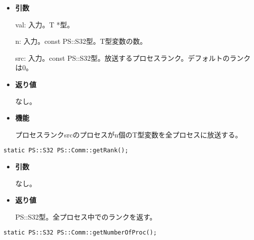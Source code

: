 \begin{itemize}

\item{{\bf 引数}}

val: 入力。T *型。

n: 入力。const PS::S32型。T型変数の数。

src: 入力。const PS::S32型。放送するプロセスランク。デフォルトのランク
は0。

\item{{\bf 返り値}}

なし。

\item{{\bf 機能}}

プロセスランクsrcのプロセスがn個のT型変数を全プロセスに放送する。

\end{itemize}








\begin{screen}
\begin{verbatim}
static PS::S32 PS::Comm::getRank();
\end{verbatim}
\end{screen}

\begin{itemize}

\item{{\bf 引数}}

なし。

\item{{\bf 返り値}}

{PS::S32}型。全プロセス中でのランクを返す。

\end{itemize}


\begin{screen}
\begin{verbatim}
static PS::S32 PS::Comm::getNumberOfProc();
\end{verbatim}
\end{screen}

